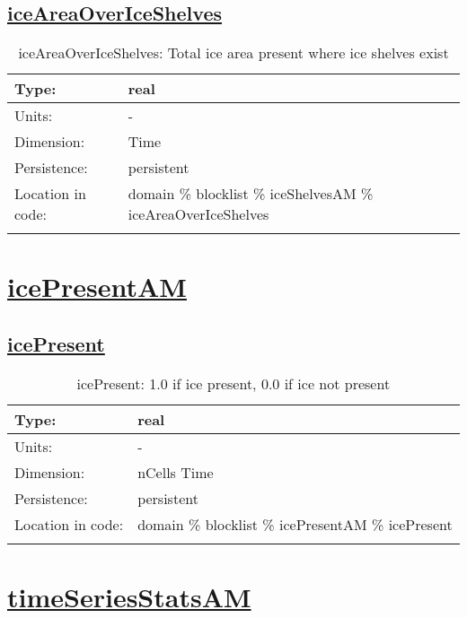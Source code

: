 \subsection[iceAreaOverIceShelves]{\hyperref[sec:var_tab_iceShelvesAM]{iceAreaOverIceShelves}}
\label{subsec:var_sec_iceShelvesAM_iceAreaOverIceShelves}
\begin{center}
\begin{longtable}{| p{2.0in} | p{4.0in} |}
        \hline 
        Type: & real \\
        \hline 
        Units: & \si{-} \\
        \hline 
        Dimension: & Time \\
        \hline 
        Persistence: & persistent \\
        \hline 
         Location in code: & domain \% blocklist \% iceShelvesAM \% iceAreaOverIceShelves \\
         \hline 
    \caption{iceAreaOverIceShelves: Total ice area present where ice shelves exist}
\end{longtable}
\end{center}
\section[icePresentAM]{\hyperref[sec:var_tab_icePresentAM]{icePresentAM}}
\label{sec:var_sec_icePresentAM}
\subsection[icePresent]{\hyperref[sec:var_tab_icePresentAM]{icePresent}}
\label{subsec:var_sec_icePresentAM_icePresent}
\begin{center}
\begin{longtable}{| p{2.0in} | p{4.0in} |}
        \hline 
        Type: & real \\
        \hline 
        Units: & \si{-} \\
        \hline 
        Dimension: & nCells Time \\
        \hline 
        Persistence: & persistent \\
        \hline 
         Location in code: & domain \% blocklist \% icePresentAM \% icePresent \\
         \hline 
    \caption{icePresent: 1.0 if ice present, 0.0 if ice not present}
\end{longtable}
\end{center}
\section[timeSeriesStatsAM]{\hyperref[sec:var_tab_timeSeriesStatsAM]{timeSeriesStatsAM}}
\label{sec:var_sec_timeSeriesStatsAM}
